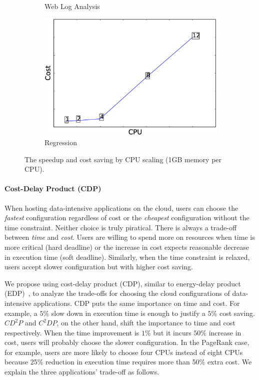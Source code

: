 \begin{figure}
\begin{subfigure}[b]{0.3\textwidth}
        \caption{Web Log Analysis}
        \label{fig:webloganalysis_cost}
    \end{subfigure}
    \begin{subfigure}[b]{0.3\textwidth}
        \includegraphics[width=\textwidth]{Chapter-CAT/figures/regression_cpu_cost_12_1.eps}
        \caption{Regression}
        \label{fig:regression_cost}
    \end{subfigure}
    \caption{The speedup and cost saving by CPU scaling (1GB memory per CPU).}
    \label{fig:speed_1gb}
\end{figure}


\paragraph*{Cost-Delay Product (CDP)}

When hosting data-intensive applications on the cloud,
users can choose the \emph{fastest} configuration regardless of cost
or the \emph{cheapest} configuration without the time constraint.
Neither choice is truly piratical.
There is always a trade-off between \emph{time} and \emph{cost}.
Users are willing to spend more on resources when
time is more critical (hard deadline) or
the increase in cost expects reasonable decrease in execution time (soft deadline).
Similarly, when the time constraint is relaxed, users accept
slower configuration but with higher cost saving.

We propose using cost-delay product (CDP),
similar to energy-delay product (EDP)~\cite{Freeh2007},
to analyze the trade-offs
for choosing the cloud configurations of data-intensive applications.
CDP puts the same importance on time and cost.
For example,
a $5\%$ slow down in execution time
is enough to justify
a $5\%$ cost saving.
$CD^2P$ and $C^2DP$, on the other hand, shift the importance to
time and cost respectively.
When the time improvement is $1\%$ but it incurs $50\%$ increase in cost,
users will probably choose the slower configuration.
In the PageRank case, for example,
users are more likely to choose four CPUs instead of eight CPUs because
25\% reduction in execution time requires
more than 50\% extra cost.
We explain the three applications' trade-off as follows.

